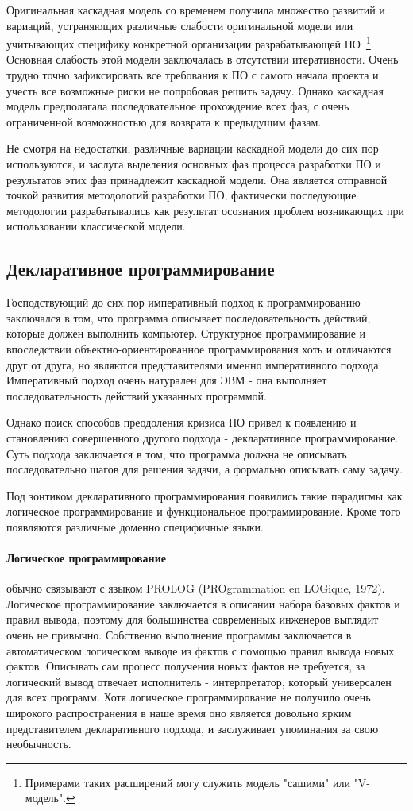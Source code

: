 Оригинальная каскадная модель со временем получила множество развитий и вариаций, устраняющих различные слабости оригинальной модели или учитывающих специфику конкретной организации разрабатывающей ПО~\footnote{Примерами таких расширений могу служить модель "сашими" или "V-модель".}. Основная слабость этой модели заключалась в отсутствии итеративности. Очень трудно точно зафиксировать все требования к ПО с самого начала проекта и учесть все возможные риски не попробовав решить задачу. Однако каскадная модель предполагала последовательное прохождение всех фаз, с очень ограниченной возможностью для возврата к предыдущим фазам.

Не смотря на недостатки, различные вариации каскадной модели до сих пор используются, и заслуга выделения основных фаз процесса разработки ПО и результатов этих фаз принадлежит каскадной модели. Она является отправной точкой развития методологий разработки ПО, фактически последующие методологии разрабатывались как результат осознания проблем возникающих при использовании классической модели.

\subsection{Декларативное программирование}

Господствующий до сих пор императивный подход к программированию заключался в том, что программа описывает последовательность действий, которые должен выполнить компьютер. Структурное программирование и впоследствии объектно-ориентированное программирования хоть и отличаются друг от друга, но являются представителями именно императивного подхода. Императивный подход очень натурален для ЭВМ - она выполняет последовательность действий указанных программой.

Однако поиск способов преодоления кризиса ПО привел к появлению и становлению совершенного другого подхода - декларативное программирование. Суть подхода заключается в том, что программа должна не описывать последовательно шагов для решения задачи, а формально описывать саму задачу.

Под зонтиком декларативного программирования появились такие парадигмы как логическое программирование и функциональное программирование. Кроме того появляются различные доменно специфичные языки.

\paragraph{Логическое программирование} обычно связывают с языком PROLOG (PROgrammation en LOGique, 1972). Логическое программирование заключается в описании набора базовых фактов и правил вывода, поэтому для большинства современных инженеров выглядит очень не привычно. Собственно выполнение программы заключается в автоматическом логическом выводе из фактов с помощью правил вывода новых фактов. Описывать сам процесс получения новых фактов не требуется, за логический вывод отвечает исполнитель - интерпретатор, который универсален для всех программ. Хотя логическое программирование не получило очень широкого распространения в наше время оно является довольно ярким представителем декларативного подхода, и заслуживает упоминания за свою необычность.

